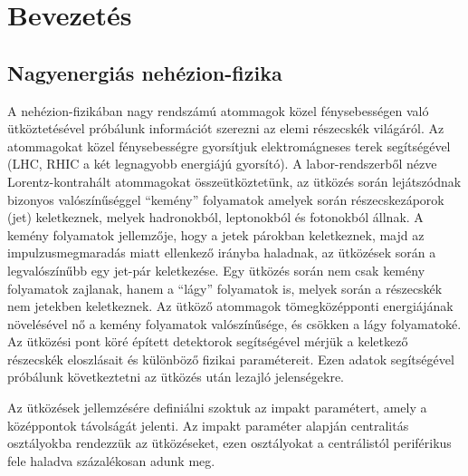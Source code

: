 \documentclass[11pt,a4paper]{article}
\numberwithin{equation}{subsection}
\numberwithin{figure}{section}
\begin{document}
\newpage
\tableofcontents

\clearpage
\pagestyle{plain}
\setcounter{page}{1}



\section{Bevezetés}

\subsection{Nagyenergiás nehézion-fizika}



A nehézion-fizikában nagy rendszámú atommagok közel fénysebességen való ütköztetésével próbálunk információt szerezni az elemi részecskék világáról. Az atommagokat közel fénysebességre gyorsítjuk elektromágneses terek segítségével (LHC, RHIC a két legnagyobb energiájú gyorsító). A labor-rendszerből nézve Lorentz-kontrahált atommagokat összeütköztetünk,  az ütközés során lejátszódnak bizonyos valószínűséggel ``kemény'' folyamatok amelyek során részecskezáporok (jet) keletkeznek, melyek hadronokból, leptonokból és fotonokból állnak. A kemény folyamatok jellemzője, hogy a jetek párokban keletkeznek, majd az impulzusmegmaradás miatt ellenkező irányba haladnak, az ütközések során a legvalószínűbb egy jet-pár keletkezése. Egy ütközés során nem csak kemény folyamatok zajlanak, hanem a ``lágy'' folyamatok is, melyek során a részecskék nem jetekben keletkeznek. Az ütköző atommagok tömegközépponti energiájának növelésével nő a kemény folyamatok valószínűsége, és csökken a lágy folyamatoké. Az ütközési pont köré épített detektorok segítségével mérjük a keletkező részecskék eloszlásait és különböző fizikai paramétereit. Ezen adatok segítségével próbálunk következtetni az ütközés után lezajló jelenségekre.

Az ütközések jellemzésére definiálni szoktuk az impakt paramétert, amely a középpontok távolságát jelenti. Az impakt paraméter alapján centralitás osztályokba rendezzük az ütközéseket, ezen osztályokat a centrálistól periférikus fele haladva százalékosan adunk meg.
\end{document}
